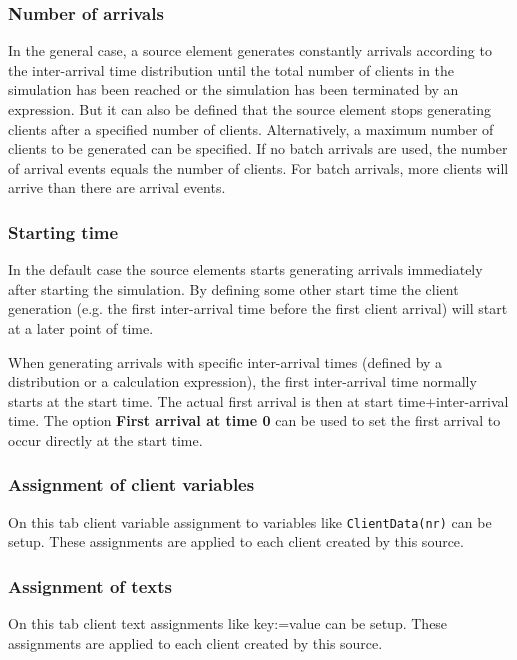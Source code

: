 \subsubsection*{Number of arrivals}

In the general case, a source element generates constantly arrivals according to the
inter-arrival time distribution until the total number of clients in the simulation has been reached
or the simulation has been terminated by an expression. But it can also be defined that the
source element stops generating clients after a specified number of clients.
Alternatively, a maximum number of clients to be generated can be specified.
If no batch arrivals are used, the number of arrival events equals the
number of clients. For batch arrivals, more clients will arrive than there are arrival events.

\subsubsection*{Starting time}

In the default case the source elements starts generating arrivals immediately after
starting the simulation. By defining some other start time the client generation
(e.g. the first inter-arrival time before the first client arrival) will start at a later
point of time.

When generating arrivals with specific inter-arrival times (defined by a distribution
or a calculation expression), the first inter-arrival time normally starts at the start time.
The actual first arrival is then at start time+inter-arrival time. The option
\textbf{First arrival at time 0} can be used to set the first arrival to occur
directly at the start time.

\subsubsection*{Assignment of client variables}

On this tab client variable assignment to variables like \texttt{ClientData(nr)} can be setup.
These assignments are applied to each client created by this source.

\subsubsection*{Assignment of texts}

On this tab client text assignments like key:=value can be setup.
These assignments are applied to each client created by this source.


